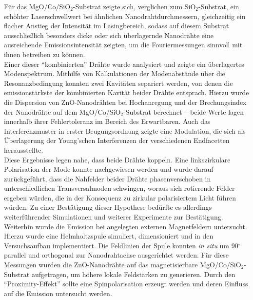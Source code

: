 Für das MgO/Co/SiO$_\text{2}$-Substrat zeigte sich, verglichen zum SiO$_\text{2}$-Substrat, ein erhöhter Laserschwellwert bei ähnlichen Nanodrahtdurchmessern, gleichzeitig ein flacher Anstieg der Intensität im Lasingbereich, sodass auf diesem Substrat ausschließlich besonders dicke oder sich überlagernde Nanodrähte eine ausreichende Emissionsintensität zeigten, um die Fouriermessungen sinnvoll mit ihnen betreiben zu können.\\
Einer dieser ``kombinierten'' Drähte wurde analysiert und zeigte ein überlagertes Modenspektrum. Mithilfe von Kalkulationen der Modenabstände über die Resonanzbedingung konnten zwei Kavitäten separiert werden, von denen die emissionstärkste der kombinierten Kavität beider Drähte entsprach. Hierzu wurde die Dispersion von ZnO-Nanodrähten bei Hochanregung und der Brechungsindex der Nanodrähte auf dem MgO/Co/SiO$_\text{2}$-Substrat berechnet – beide Werte lagen innerhalb ihrer Fehlertoleranz im Bereich des Erwartbaren. Auch das Interferenzmuster in erster Beugungsordnung zeigte eine Modulation, die sich als Überlagerung der Young'schen Interferenzen der verschiedenen Endfacetten herausstellte.\\
Diese Ergebnisse legen nahe, dass beide Drähte koppeln. Eine linkszirkulare Polarisation der Mode konnte nachgewiesen werden und wurde darauf zurückgeführt, dass die Nahfelder beider Drähte phasenverschoben in unterschiedlichen Transversalmoden schwingen, woraus sich rotierende Felder ergeben würden, die in der Konsequenz zu zirkular polarisiertem Licht führen würden. Zu einer Bestätigung dieser Hypothese bedürfte es allerdings weiterführender Simulationen und weiterer Experimente zur Bestätigung.\\
Weiterhin wurde die Emission bei angelegten externen Magnetfeldern untersucht. Hierzu wurde eine Helmholtzspule  simuliert, dimensioniert und in den Versuchsaufbau implementiert. Die Feldlinien der Spule konnten \textit{in situ} um 90$^\circ$ parallel und orthogonal zur Nanodrahtachse ausgerichtet werden. Für diese Messungen wurden die ZnO-Nanodrähte auf das magnetisierbare MgO/Co/SiO$_\text{2}$-Substrat aufgetragen, um höhere lokale Feldstärken zu generieren. Durch den ``Proximity-Effekt'' sollte eine Spinpolarisation erzeugt werden und deren Einfluss auf die Emission untersucht werden.\\
